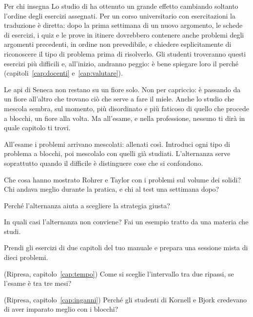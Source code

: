 \begin{riquadro}{Per chi insegna}
Lo studio di \textcite{rohrer2020} ha ottenuto un grande effetto
cambiando soltanto l'ordine degli esercizi assegnati. Per un corso
universitario con esercitazioni la traduzione è diretta: dopo la prima
settimana di un nuovo argomento, le schede di esercizi, i quiz e le
prove in itinere dovrebbero contenere anche problemi degli argomenti
precedenti, in ordine non prevedibile, e chiedere esplicitamente di
riconoscere il tipo di problema prima di risolverlo. Gli studenti
troveranno questi esercizi più difficili e, all'inizio, andranno
peggio: è bene spiegare loro il perché
(capitoli~\ref{cap:docenti} e~\ref{cap:valutare}).
\end{riquadro}

\asterismo

Le api di Seneca non restano su un fiore solo. Non per capriccio: è
passando da un fiore all'altro che trovano ciò che serve a fare il
miele. Anche lo studio che mescola sembra, sul momento, più
disordinato e più faticoso di quello che procede a blocchi, un fiore
alla volta. Ma all'esame, e nella professione, nessuno ti dirà in
quale capitolo ti trovi.

\begin{daricordare}
All'esame i problemi arrivano mescolati: allenati così. Introduci ogni
tipo di problema a blocchi, poi mescolalo con quelli già studiati.
L'alternanza serve soprattutto quando il difficile è distinguere cose
che si confondono.
\end{daricordare}

\begin{domande}
  \item Che cosa hanno mostrato Rohrer e Taylor con i problemi sul
        volume dei solidi? Chi andava meglio durante la pratica, e chi
        al test una settimana dopo?
  \item Perché l'alternanza aiuta a scegliere la strategia giusta?
  \item In quali casi l'alternanza non conviene? Fai un esempio tratto
        da una materia che studi.
  \item Prendi gli esercizi di due capitoli del tuo manuale e prepara
        una sessione mista di dieci problemi.
  \item (Ripresa, capitolo~\ref{cap:tempo}) Come si sceglie
        l'intervallo tra due ripassi, se l'esame è tra tre mesi?
  \item (Ripresa, capitolo~\ref{cap:inganni}) Perché gli studenti di
        Kornell e Bjork credevano di aver imparato meglio con i
        blocchi?
\end{domande}


